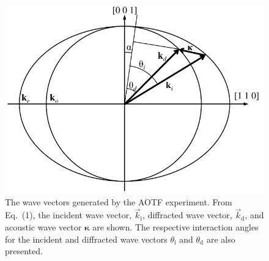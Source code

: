 \documentclass[amtd, online, hvmath]{copernicus}
\begin{document}
\begin{figure}
\includegraphics[width=120mm]{amt-2015-329-discussions-f01.pdf}
\caption{The wave vectors generated by the AOTF experiment. From
  Eq.~(1), the incident wave vector, $\vec{k}_{\mathrm{i}}$,
  diffracted wave vector, $\vec{k}_{\mathrm{d}}$, and acoustic wave
  vector $\boldsymbol{\kappa}$ are shown. The respective interaction
  angles for the incident and diffracted wave vectors
  $\theta_{\mathrm{i}}$ and $\theta_{\mathrm{d}}$ are also presented.}
\label{amtd-2015-0329-f01.pdf}
\end{figure}
\end{document}
